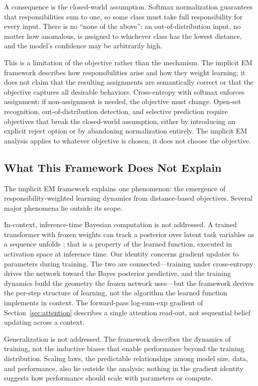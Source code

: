A consequence is the closed-world assumption. Softmax normalization guarantees that responsibilities sum to one, so some class must take full responsibility for every input. There is no ``none of the above'': an out-of-distribution input, no matter how anomalous, is assigned to whichever class has the lowest distance, and the model's confidence may be arbitrarily high.

This is a limitation of the objective rather than the mechanism. The implicit EM framework describes how responsibilities arise and how they weight learning; it does not claim that the resulting assignments are semantically correct or that the objective captures all desirable behaviors. Cross-entropy with softmax enforces assignment; if non-assignment is needed, the objective must change. Open-set recognition, out-of-distribution detection, and selective prediction require objectives that break the closed-world assumption, either by introducing an explicit reject option or by abandoning normalization entirely. The implicit EM analysis applies to whatever objective is chosen; it does not choose the objective.

\subsection{What This Framework Does Not Explain}

The implicit EM framework explains one phenomenon: the emergence of responsibility-weighted learning dynamics from distance-based objectives. Several major phenomena lie outside its scope.

In-context, inference-time Bayesian computation is not addressed. A trained transformer with frozen weights can track a posterior over latent task variables as a sequence unfolds \citep{agarwal2025geometry,agarwal2025scaling}; that is a property of the learned function, executed in activation space at inference time. Our identity concerns gradient updates to parameters during training. The two are connected---training under cross-entropy drives the network toward the Bayes posterior predictive, and the training dynamics build the geometry the frozen network uses---but the framework derives the per-step structure of learning, not the algorithm the learned function implements in context. The forward-pass log-sum-exp gradient of Section~\ref{sec:attention} describes a single attention read-out, not sequential belief updating across a context.

Generalization is not addressed. The framework describes the dynamics of training, not the inductive biases that enable performance beyond the training distribution. Scaling laws, the predictable relationships among model size, data, and performance, also lie outside the analysis; nothing in the gradient identity suggests how performance should scale with parameters or compute.

